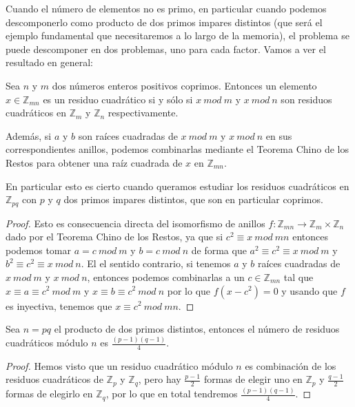 Cuando el n\'umero de elementos no es primo, en particular cuando podemos descomponerlo como producto de dos primos impares distintos (que ser\'a el ejemplo fundamental que
necesitaremos a lo largo de la memoria), el problema se puede descomponer en dos problemas, uno para cada factor. Vamos a ver el resultado en general:

\begin{proposition}
\label{numResCuadpq:prop}
Sea $n$ y $m$ dos n\'umeros enteros positivos coprimos. Entonces un elemento
$x \in {\mathbb Z}_{mn}$ es un residuo cuadr\'atico si y s\'olo si $x~mod~m$
y $x~mod~n$ son residuos cuadr\'aticos en ${\mathbb Z}_m$ y ${\mathbb Z}_n$
respectivamente.

Adem\'as, si $a$ y $b$ son ra\'ices cuadradas de $x~mod~m$ y $x~mod~n$ en sus
correspondientes anillos, podemos combinarlas mediante el Teorema Chino de los Restos
para obtener una ra\'iz cuadrada de $x$ en ${\mathbb Z}_{mn}$.

En particular esto es cierto cuando queramos estudiar los residuos cuadr\'aticos en
${\mathbb Z}_{pq}$ con $p$ y $q$ dos primos impares distintos, que son en particular coprimos.
\end{proposition}
\begin{proof}
Esto es consecuencia directa del isomorfismo de anillos $f:{\mathbb Z}_{mn} \to {\mathbb Z}_m \times {\mathbb Z}_n$ dado por el Teorema Chino de los Restos, ya que si
$c^2 \equiv x ~mod~mn$ entonces podemos tomar $a = c~mod~m$ y $b = c~mod~n$ de forma que $a^2 \equiv c^2 \equiv x ~mod~m$ y $b^2 \equiv c^2 \equiv x~mod~n$. El
el sentido contrario, si tenemos $a$ y $b$ ra\'ices cuadradas de $x~mod~m$ y $x~mod~n$, entonces podemos combinarlas a un $c \in {\mathbb Z}_{mn}$ tal que
$x \equiv a \equiv c^2~mod~m$ y $x \equiv b \equiv c^2 ~mod~n$ por lo que $f(x-c^2) = 0$ y usando que $f$ es inyectiva, tenemos que $x \equiv c^2 ~mod~mn$.
\end{proof}

\begin{corollary}
Sea $n = pq$ el producto de dos primos distintos, entonces el n\'umero de residuos cuadr\'aticos m\'odulo $n$ es $\frac{(p-1)(q-1)}{4}$.
\end{corollary}
\begin{proof}
Hemos visto que un residuo cuadr\'atico m\'odulo $n$ es combinaci\'on de los residuos cuadr\'aticos de ${\mathbb Z}_p$ y ${\mathbb Z}_q$, pero hay $\frac{p-1}{2}$ formas
de elegir uno en ${\mathbb Z}_p$ y $\frac{q-1}{2}$ formas de elegirlo en ${\mathbb Z}_q$, por lo que en total tendremos $\frac{(p-1)(q-1)}{4}$.
\end{proof}

